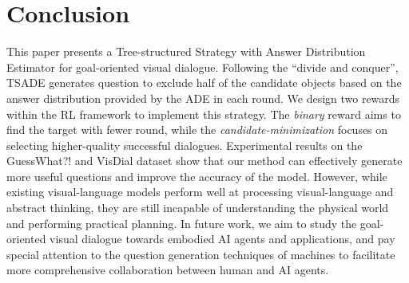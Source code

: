 \section{Conclusion}

This paper presents a Tree-structured Strategy with Answer Distribution Estimator for goal-oriented visual dialogue. Following the ``divide and conquer'', TSADE generates question to exclude half of the candidate objects based on the answer distribution provided by the ADE in each round. We design two rewards within the RL framework to implement this strategy. The \emph{binary} reward aims to find the target with fewer round, while the \emph{candidate-minimization} focuses on selecting higher-quality successful dialogues. Experimental results on the GuessWhat?! and VisDial dataset show that our method can effectively generate more useful questions and improve the accuracy of the model. 
However, while existing visual-language models perform well at processing visual-language and abstract thinking, they are still incapable of understanding the physical world and performing practical planning.
In future work, we aim to study the goal-oriented visual dialogue towards embodied AI agents and applications, and pay special attention to the question generation techniques of machines to facilitate more comprehensive collaboration between human and AI agents.


